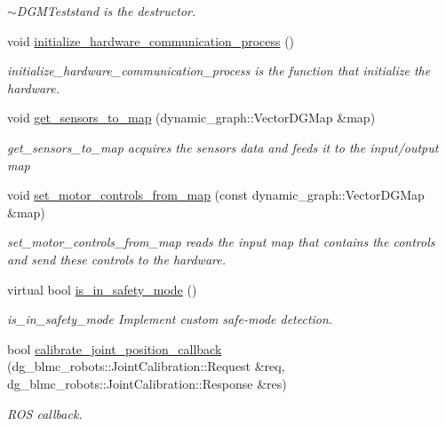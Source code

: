 \begin{DoxyCompactItemize}
\begin{DoxyCompactList}\small\item\em $\sim$\+D\+G\+M\+Teststand is the destructor. \end{DoxyCompactList}\item 
void \hyperlink{classdg__blmc__robots_1_1DGMTeststand_a8495e1f1eb764ff3118d0e8dc60bc686}{initialize\+\_\+hardware\+\_\+communication\+\_\+process} ()
\begin{DoxyCompactList}\small\item\em initialize\+\_\+hardware\+\_\+communication\+\_\+process is the function that initialize the hardware. \end{DoxyCompactList}\item 
void \hyperlink{classdg__blmc__robots_1_1DGMTeststand_ac0f85de90afcf35c01930f3504c8ac0e}{get\+\_\+sensors\+\_\+to\+\_\+map} (dynamic\+\_\+graph\+::\+Vector\+D\+G\+Map \&map)
\begin{DoxyCompactList}\small\item\em get\+\_\+sensors\+\_\+to\+\_\+map acquires the sensors data and feeds it to the input/output map \end{DoxyCompactList}\item 
void \hyperlink{classdg__blmc__robots_1_1DGMTeststand_a8b0ec086e17a6aae248c5c05014ad8a5}{set\+\_\+motor\+\_\+controls\+\_\+from\+\_\+map} (const dynamic\+\_\+graph\+::\+Vector\+D\+G\+Map \&map)
\begin{DoxyCompactList}\small\item\em set\+\_\+motor\+\_\+controls\+\_\+from\+\_\+map reads the input map that contains the controls and send these controls to the hardware. \end{DoxyCompactList}\item 
virtual bool \hyperlink{classdg__blmc__robots_1_1DGMTeststand_a90fd2d9a7e579cbeb9daf2f0ba0d2a02}{is\+\_\+in\+\_\+safety\+\_\+mode} ()\hypertarget{classdg__blmc__robots_1_1DGMTeststand_a90fd2d9a7e579cbeb9daf2f0ba0d2a02}{}\label{classdg__blmc__robots_1_1DGMTeststand_a90fd2d9a7e579cbeb9daf2f0ba0d2a02}

\begin{DoxyCompactList}\small\item\em is\+\_\+in\+\_\+safety\+\_\+mode Implement custom safe-\/mode detection. \end{DoxyCompactList}\item 
bool \hyperlink{classdg__blmc__robots_1_1DGMTeststand_a133087f3899672101df62fbf95fac292}{calibrate\+\_\+joint\+\_\+position\+\_\+callback} (dg\+\_\+blmc\+\_\+robots\+::\+Joint\+Calibration\+::\+Request \&req, dg\+\_\+blmc\+\_\+robots\+::\+Joint\+Calibration\+::\+Response \&res)
\begin{DoxyCompactList}\small\item\em R\+OS callback. \end{DoxyCompactList}\end{DoxyCompactItemize}

